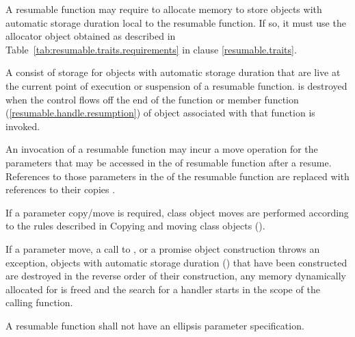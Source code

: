 \pnum
A resumable function may require to allocate
memory to store objects with automatic storage duration
local to the resumable function. If so, it must
use the allocator object obtained as described in 
Table~\ref{tab:resumable.traits.requirements} in clause \ref{resumable.traits}.

\pnum
A  consist of 
storage for objects with automatic storage duration
that are live at the current point of execution or suspension of 
a resumable function.
 is destroyed when
the control flows off the end of the function or
 member function (\ref{resumable.handle.resumption}) of  object associated with that function is invoked.

\pnum
An invocation of a resumable function may incur a move operation for the parameters that may be accessed in the 
of resumable function after a resume. 
References to those parameters in the 
of the resumable function are replaced with 
references to their copies .

\pnum
If a parameter copy/move is required, class object moves are performed according to the rules described in Copying and moving class objects ().

\pnum
If a parameter move, a call to , or a promise object construction throws
an exception, objects with automatic storage duration () that have been
constructed are destroyed in the reverse order of their construction, any memory dynamically allocated 
for  is freed
and the search for a handler starts in the scope of the calling function. 

\pnum
A resumable function shall not have an ellipsis parameter specification. 


%
